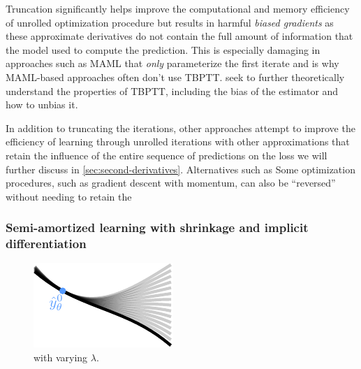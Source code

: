 \documentclass[twoside,11pt]{article}
\begin{document}
Truncation significantly helps improve the computational
and memory efficiency of unrolled optimization procedure
but results in harmful \emph{biased gradients} as
these approximate derivatives do not contain
the full amount of information that the model used
to compute the prediction.
This is especially damaging in approaches
such as MAML \citep{finn2017model} that \emph{only}
parameterize the first iterate and is why MAML-based
approaches often don't use TBPTT.
\citet{tallec2017unbiasing,wu2018understanding,liao2018reviving,shaban2019truncated,vicol2021unbiased}
seek to further theoretically understand the properties
of TBPTT, including the bias of the estimator
and how to unbias it.

In addition to truncating the iterations, other approaches
attempt to improve the efficiency of learning through
unrolled iterations with other approximations
that retain the influence of the entire sequence
of predictions on the loss
\citep{finn2017model,nichol2018first,lorraine2020optimizing}
we will further discuss in
\cref{sec:second-derivatives}.
Alternatives such as \citep{maclaurin2015gradient,franceschi2017forward}
Some optimization procedures, such as gradient descent with momentum,
can also be ``reversed'' without needing to retain the

\subsubsection{Semi-amortized learning with shrinkage and implicit differentiation}
\begin{figure}
\includegraphics[width=\linewidth]{fig/imaml.pdf}
\caption{ with varying $\lambda$.}
\label{fig:imaml}
\vspace{-3mm}
\end{figure}
\end{document}
